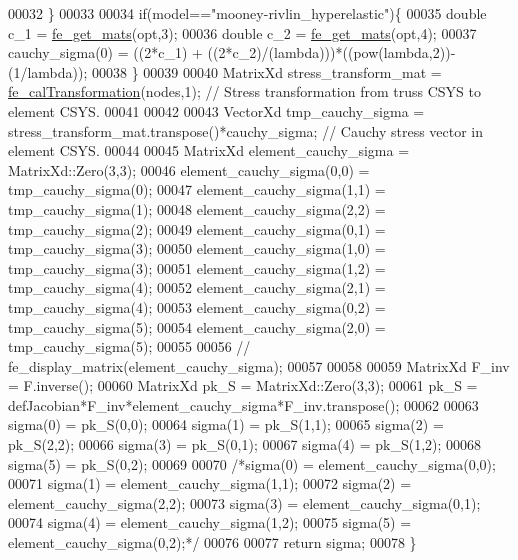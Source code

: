 \begin{DoxyCode}
00032     \}
00033 
00034     \textcolor{keywordflow}{if}(model==\textcolor{stringliteral}{"mooney-rivlin\_hyperelastic"})\{
00035         \textcolor{keywordtype}{double} c\_1 = \hyperlink{functions_8h_af7ffbad6dfcc99fc88b130c1a7b1720a}{fe\_get\_mats}(opt,3);
00036         \textcolor{keywordtype}{double} c\_2 = \hyperlink{functions_8h_af7ffbad6dfcc99fc88b130c1a7b1720a}{fe\_get\_mats}(opt,4);
00037         cauchy\_sigma(0) = ((2*c\_1) + ((2*c\_2)/(lambda)))*((pow(lambda,2))-(1/lambda));
00038     \}
00039 
00040     MatrixXd stress\_transform\_mat = \hyperlink{functions_8h_aa41c40dffea4251a07a8a3f5062f47ae}{fe\_calTransformation}(nodes,1); \textcolor{comment}{// Stress
       transformation from truss CSYS to element CSYS.}
00041 
00042 
00043     VectorXd tmp\_cauchy\_sigma = stress\_transform\_mat.transpose()*cauchy\_sigma; \textcolor{comment}{// Cauchy stress vector in
       element CSYS.}
00044 
00045     MatrixXd element\_cauchy\_sigma = MatrixXd::Zero(3,3);
00046     element\_cauchy\_sigma(0,0) = tmp\_cauchy\_sigma(0);
00047     element\_cauchy\_sigma(1,1) = tmp\_cauchy\_sigma(1);
00048     element\_cauchy\_sigma(2,2) = tmp\_cauchy\_sigma(2);
00049     element\_cauchy\_sigma(0,1) = tmp\_cauchy\_sigma(3);
00050     element\_cauchy\_sigma(1,0) = tmp\_cauchy\_sigma(3);
00051     element\_cauchy\_sigma(1,2) = tmp\_cauchy\_sigma(4);
00052     element\_cauchy\_sigma(2,1) = tmp\_cauchy\_sigma(4);
00053     element\_cauchy\_sigma(0,2) = tmp\_cauchy\_sigma(5);
00054     element\_cauchy\_sigma(2,0) = tmp\_cauchy\_sigma(5);
00055 
00056     \textcolor{comment}{// fe\_display\_matrix(element\_cauchy\_sigma);}
00057 
00058 
00059     MatrixXd F\_inv = F.inverse();
00060     MatrixXd pk\_S = MatrixXd::Zero(3,3);
00061     pk\_S = defJacobian*F\_inv*element\_cauchy\_sigma*F\_inv.transpose();
00062 
00063     sigma(0) = pk\_S(0,0);
00064     sigma(1) = pk\_S(1,1);
00065     sigma(2) = pk\_S(2,2);
00066     sigma(3) = pk\_S(0,1);
00067     sigma(4) = pk\_S(1,2);
00068     sigma(5) = pk\_S(0,2);
00069 
00070     \textcolor{comment}{/*sigma(0) = element\_cauchy\_sigma(0,0);}
00071 \textcolor{comment}{    sigma(1) = element\_cauchy\_sigma(1,1);}
00072 \textcolor{comment}{    sigma(2) = element\_cauchy\_sigma(2,2);}
00073 \textcolor{comment}{    sigma(3) = element\_cauchy\_sigma(0,1);}
00074 \textcolor{comment}{    sigma(4) = element\_cauchy\_sigma(1,2);}
00075 \textcolor{comment}{    sigma(5) = element\_cauchy\_sigma(0,2);*/}
00076 
00077     \textcolor{keywordflow}{return} sigma;
00078 \}
\end{DoxyCode}
